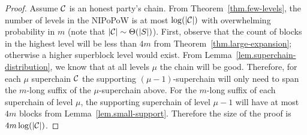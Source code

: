 \begin{proof}
    Assume $\mathcal{C}$ is an honest party's chain. From
    Theorem~\ref{thm.few-levels}, the number of levels in the NIPoPoW is at most
    $\log(|\mathcal{C}|)$ with overwhelming probability in $m$ (note that $|\mathcal{C}|
    \sim \Theta(|S|)$). First, observe that the count of blocks in the highest
    level will be less than $4m$ from Theorem~\ref{thm.large-expansion};
    otherwise a higher superblock level would exist. From
    Lemma~\ref{lem.superchain-distribution}, we know that at all levels $\mu$
    the chain will be good. Therefore, for each $\mu$ superchain $\mathcal{C}$ the
    supporting $(\mu - 1)$-superchain will only need to span the $m$-long suffix
    of the $\mu$-superchain above. For the $m$-long suffix of each superchain of
    level $\mu$, the supporting superchain of level $\mu - 1$ will have at most
    $4m$ blocks from Lemma~\ref{lem.small-support}. Therefore the size of the
    proof is $4m \log(|\mathcal{C}|)$.
    \Qed
\end{proof}
